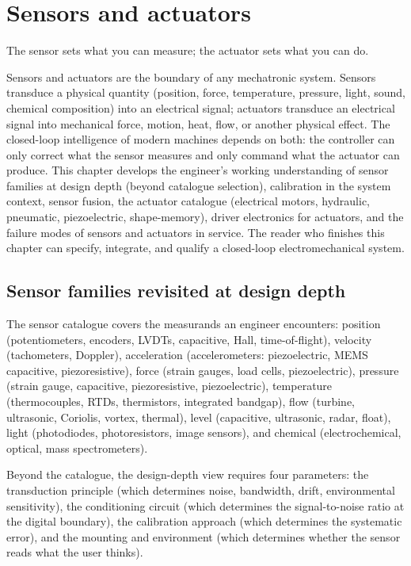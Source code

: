 \chapter{Sensors and actuators}
\label{vol08:ch11}

\epigraph{The sensor sets what you can measure; the actuator sets what you can do.}{}


\noindent
Sensors and actuators are the boundary of any mechatronic system. Sensors transduce a physical quantity (position, force, temperature, pressure, light, sound, chemical composition) into an electrical signal; actuators transduce an electrical signal into mechanical force, motion, heat, flow, or another physical effect. The closed-loop intelligence of modern machines depends on both: the controller can only correct what the sensor measures and only command what the actuator can produce. This chapter develops the engineer's working understanding of sensor families at design depth (beyond catalogue selection), calibration in the system context, sensor fusion, the actuator catalogue (electrical motors, hydraulic, pneumatic, piezoelectric, shape-memory), driver electronics for actuators, and the failure modes of sensors and actuators in service. The reader who finishes this chapter can specify, integrate, and qualify a closed-loop electromechanical system.

\section{Sensor families revisited at design depth}

The sensor catalogue covers the measurands an engineer encounters: position (potentiometers, encoders, LVDTs, capacitive, Hall, time-of-flight), velocity (tachometers, Doppler), acceleration (accelerometers: piezoelectric, MEMS capacitive, piezoresistive), force (strain gauges, load cells, piezoelectric), pressure (strain gauge, capacitive, piezoresistive, piezoelectric), temperature (thermocouples, RTDs, thermistors, integrated bandgap), flow (turbine, ultrasonic, Coriolis, vortex, thermal), level (capacitive, ultrasonic, radar, float), light (photodiodes, photoresistors, image sensors), and chemical (electrochemical, optical, mass spectrometers).

Beyond the catalogue, the design-depth view requires four parameters: the transduction principle (which determines noise, bandwidth, drift, environmental sensitivity), the conditioning circuit (which determines the signal-to-noise ratio at the digital boundary), the calibration approach (which determines the systematic error), and the mounting and environment (which determines whether the sensor reads what the user thinks).

